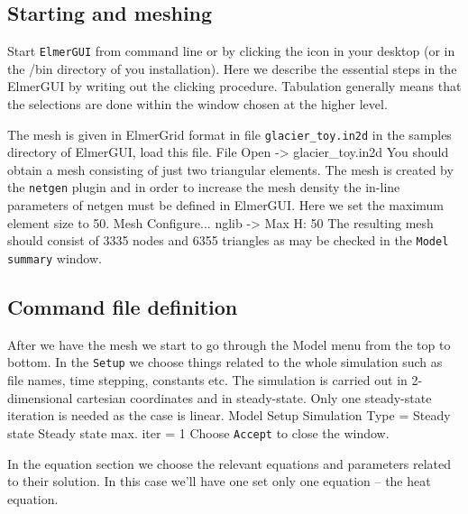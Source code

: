 \subsection*{Starting and meshing}

Start \texttt{ElmerGUI} from command line or by clicking the icon in your desktop (or in the /bin directory of you installation). 
Here we describe the essential steps in the ElmerGUI by writing out the clicking procedure. Tabulation generally means that the 
selections are done within the window chosen at the higher level. 

The mesh is given in ElmerGrid format in file \texttt{glacier\_toy.in2d} in the samples directory of ElmerGUI, 
load this file.
\ttbegin
File 
  Open -> glacier\_toy.in2d
\ttend
You should obtain a mesh consisting of just two triangular elements. The mesh is created by the \texttt{netgen} plugin 
and in order to increase the mesh density the in-line parameters of netgen must be defined in ElmerGUI.
Here we set the maximum element size to 50. 
\ttbegin
Mesh
  Configure... 
    nglib -> Max H: 50
\ttend
The resulting mesh should consist of 3335 nodes and 6355 triangles as may be checked in the 
\texttt{Model summary} window.


\subsection*{Command file definition}

After we have the mesh we start to go through the Model menu from the top to bottom. 
In the \texttt{Setup} we choose things related to the whole simulation such as file names, 
time stepping, constants etc.
The simulation is carried out in 2-dimensional cartesian
coordinates and in steady-state. 
Only one steady-state iteration is needed as the case is linear. 
\ttbegin
Model
  Setup 
    Simulation Type = Steady state
    Steady state max. iter = 1
\ttend
Choose \texttt{Accept} to close the window.

In the equation section we choose the relevant equations and parameters related to their solution. 
In this case we'll have one set only one equation -- the heat equation.


